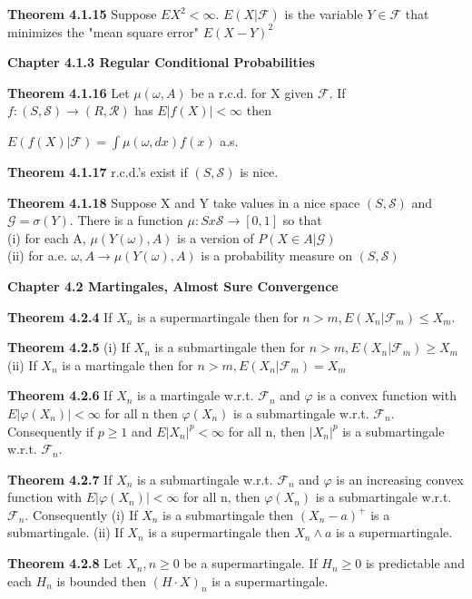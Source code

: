 \documentclass{article}
\newcommand\tab[1][1cm]{\hspace*{#1}}
\begin{document}
\textbf {Theorem 4.1.15} Suppose $EX^2 < \infty$. $E(X|\mathcal{F})$ is the variable $Y \in \mathcal{F}$ that minimizes the "mean square error" $E(X-Y)^2$

\textbf {Chapter 4.1.3 Regular Conditional Probabilities}

\textbf {Theorem 4.1.16} Let $\mu (\omega, A)$ be a r.c.d. for X given $\mathcal{F}$. If $f : (S,\mathcal{S}) \to (R, \mathcal{R})$ has $E|f(X)| < \infty$ then
\begin{center}
$E(f(X)|\mathcal{F}) = \int \mu(\omega, dx) f(x)$ \tab a.s.
\end{center}

\textbf {Theorem 4.1.17} r.c.d.'s exist if $(S, \mathcal{S})$ is nice.

\textbf {Theorem 4.1.18} Suppose X and Y take values in a nice space $(S, \mathcal{S})$ and $\mathcal{G} = \sigma(Y)$. There is a function $\mu : S x \mathcal{S} \to [0,1]$ so that 
\\
(i) for each A, $\mu(Y(\omega), A)$ is a version of $P(X \in A|\mathcal{G})$ \\
(ii) for a.e. $\omega , A \to \mu(Y(\omega), A)$ is a probability measure on $(S, \mathcal{S})$

\textbf {Chapter 4.2 Martingales, Almost Sure Convergence}

\textbf {Theorem 4.2.4} If $X_n$ is a supermartingale then for $n > m, E(X_n|\mathcal{F}_m) \leq X_m$.

\textbf {Theorem 4.2.5} (i) If $X_n$ is a submartingale then for $n > m, E(X_n| \mathcal{F}_m) \geq X_m$ \\
(ii) If $X_n$ is a martingale then for $n > m, E(X_n|\mathcal{F}_m) = X_m$

\textbf {Theorem 4.2.6} If $X_n$ is a martingale w.r.t. $\mathcal{F}_n$ and $\varphi$ is a convex function with $E|\varphi(X_n)| < \infty$ for all n then $\varphi(X_n)$ is a submartingale w.r.t. $\mathcal{F}_n$. Consequently if $p \geq 1$ and $E|X_n|^p < \infty$ for all n, then $|X_n|^p$ is a submartingale w.r.t. $\mathcal{F}_n$.

\textbf {Theorem 4.2.7} If $X_n$ is a submartingale w.r.t. $\mathcal{F}_n$ and $\varphi$ is an increasing convex function with $E|\varphi(X_n)| < \infty$ for all n, then $\varphi(X_n)$ is a submartingale w.r.t. $\mathcal{F}_n$. Consequently (i) If $X_n$ is a submartingale then $(X_n - a)^+$ is a submartingale. (ii) If $X_n$ is a supermartingale then $X_n \land a$ is a supermartingale.

\textbf {Theorem 4.2.8} Let $X_n, n \geq 0$ be a supermartingale. If $H_n \geq 0$ is predictable and each $H_n$ is bounded then $(H \cdot X)_n$ is a supermartingale.
\end{document}
